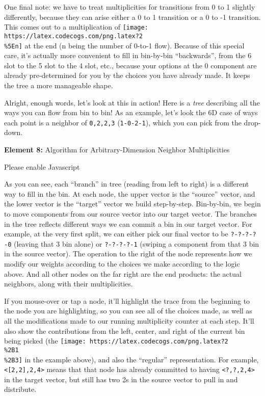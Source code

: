 \documentclass[]{article}
\begin{document}
One final note: we have to treat multiplicities for transitions from 0 to 1
slightly differently, because they can arise either a 0 to 1 transition or a 0
to -1 transition. This comes out to a multiplication of
\texttt{[image: https://latex.codecogs.com/png.latex?2\\\%5En]} at the end (n
being the number of 0-to-1 flow). Because of this special care, it's actually
more convenient to fill in bin-by-bin ``backwards'', from the 6 slot to the 5
slot to the 4 slot, etc., because your options at the 0 component are already
pre-determined for you by the choices you have already made. It keeps the tree a
more manageable shape.

Alright, enough words, let's look at this in action! Here is a \emph{tree}
describing all the ways you can flow from bin to bin! As an example, let's look
the 6D case of ways each point is a neighbor of \texttt{0,2,2,3}
(\texttt{1-0-2-1}), which you can pick from the drop-down.

\leavevmode\hypertarget{golTree}{}%
\textbf{Element 8:} Algorithm for Arbitrary-Dimension Neighbor Multiplicities

\leavevmode\hypertarget{golTreeCont}{}%
Please enable Javascript

As you can see, each ``branch'' in tree (reading from left to right) is a
different way to fill in the bin. At each node, the upper vector is the
``source'' vector, and the lower vector is the ``target'' vector we build
step-by-step. Bin-by-bin, we begin to move components from our source vector
into our target vector. The branches in the tree reflects different ways we can
commit a bin in our target vector. For example, at the very first split, we can
either pick our final vector to be \texttt{?-?-?-?-0} (leaving that 3 bin alone)
or \texttt{?-?-?-?-1} (swiping a component from that 3 bin in the source
vector). The operation to the right of the node represents how we modify our
weights according to the choices we make according to the logic above. And all
other nodes on the far right are the end products: the actual neighbors, along
with their multiplicities.

If you mouse-over or tap a node, it'll highlight the trace from the beginning to
the node you are highlighting, so you can see all of the choices made, as well
as all the modifications made to our running multiplicity counter at each step.
It'll also show the contributions from the left, center, and right of the
current bin being picked (the
\texttt{[image: https://latex.codecogs.com/png.latex?2\\\%2B1\\\%2B3]} in the
example above), and also the ``regular'' representation. For example,
\texttt{\textless{}{[}2,2{]},2,4\textgreater{}} means that that node has already
committed to having \texttt{\textless{}?,?,2,4\textgreater{}} in the target
vector, but still has two 2s in the source vector to pull in and distribute.
\end{document}
